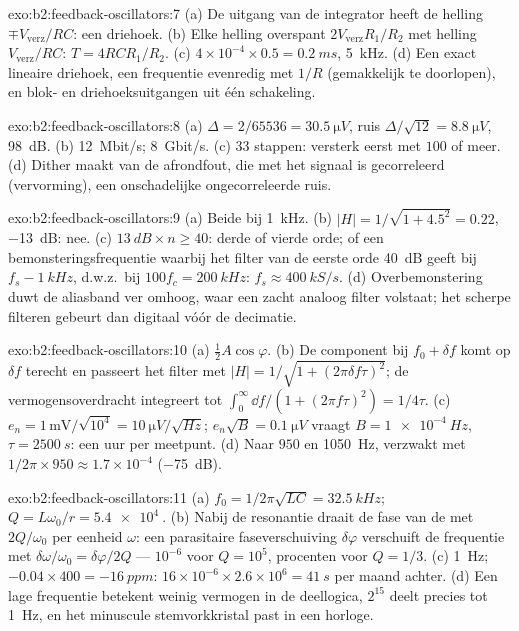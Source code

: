 \begin{solution}{exo:b2:feedback-oscillators:7}
(a) De uitgang van de integrator heeft de helling $\mp V_{\text{verz}}/RC$:
een driehoek. (b) Elke helling overspant $2V_{\text{verz}}R_1/R_2$ met
helling $V_{\text{verz}}/RC$: $T = 4RCR_1/R_2$. (c)
$4 \times 10^{-4} \times 0.5 = \qty{0.2}{ms}$, \qty{5}{kHz}. (d) Een exact
lineaire driehoek, een frequentie evenredig met $1/R$ (gemakkelijk te
doorlopen), en blok- en driehoeksuitgangen uit één schakeling.
\end{solution}

\begin{solution}{exo:b2:feedback-oscillators:8}
(a) $\Delta = 2/65536 = \qty{30.5}{\micro V}$, ruis
$\Delta/\sqrt{12} = \qty{8.8}{\micro V}$, \qty{98}{dB}. (b)
\qty{12}{Mbit/s}; \qty{8}{Gbit/s}. (c) $33$ stappen: versterk eerst met
$100$ of meer. (d) Dither maakt van de afrondfout, die met het signaal is
gecorreleerd (vervorming), een onschadelijke ongecorreleerde ruis.
\end{solution}

\begin{solution}{exo:b2:feedback-oscillators:9}
(a) Beide bij \qty{1}{kHz}. (b) $|H| = 1/\sqrt{1 + 4.5^2} = 0.22$,
\qty{-13}{dB}: nee. (c) $\qty{13}{dB} \times n \ge 40$: derde of vierde
orde; of een bemonsteringsfrequentie waarbij het filter van de eerste orde
\qty{40}{dB} geeft bij $f_s - \qty{1}{kHz}$, d.w.z.\ bij
$100f_c = \qty{200}{kHz}$: $f_s \approx \qty{400}{kS/s}$. (d)
Overbemonstering duwt de aliasband ver omhoog, waar een zacht analoog filter
volstaat; het scherpe filteren gebeurt dan digitaal vóór de decimatie.
\end{solution}

\begin{solution}{exo:b2:feedback-oscillators:10}
(a) $\tfrac12A\cos\varphi$. (b) De component bij $f_0 + \delta f$ komt op
$\delta f$ terecht en passeert het filter met
$|H| = 1/\sqrt{1 + (2\pi\delta f\tau)^2}$; de vermogensoverdracht integreert
tot $\int_0^\infty\dd f/(1 + (2\pi f\tau)^2) = 1/4\tau$. (c)
$e_n = 1\,\text{mV}/\sqrt{10^4} = \qty{10}{\micro V/\sqrt{Hz}}$;
$e_n\sqrt B = \qty{0.1}{\micro V}$ vraagt $B = \qty{1e-4}{Hz}$,
$\tau = \qty{2500}{s}$: een uur per meetpunt. (d) Naar $950$ en
\qty{1050}{Hz}, verzwakt met $1/2\pi \times 950 \approx 1.7 \times 10^{-4}$
(\qty{-75}{dB}).
\end{solution}

\begin{solution}{exo:b2:feedback-oscillators:11}
(a) $f_0 = 1/2\pi\sqrt{LC} = \qty{32.5}{kHz}$;
$Q = L\omega_0/r = \qty{5.4e4}{}$. (b) Nabij de resonantie draait de fase
van de  met $2Q/\omega_0$ per eenheid $\omega$: een
parasitaire faseverschuiving $\delta\varphi$ verschuift de frequentie met
$\delta\omega/\omega_0 =
\delta\varphi/2Q$ --- $10^{-6}$ voor $Q = 10^5$,
procenten voor $Q = 1/3$. (c) \qty{1}{Hz};
$-0.04 \times 400 = \qty{-16}{ppm}$:
$16 \times 10^{-6} \times 2.6 \times 10^6 = \qty{41}{s}$ per maand achter.
(d) Een lage frequentie betekent weinig vermogen in de deellogica, $2^{15}$
deelt precies tot \qty{1}{Hz}, en het minuscule stemvorkkristal past in een
horloge.
\end{solution}

